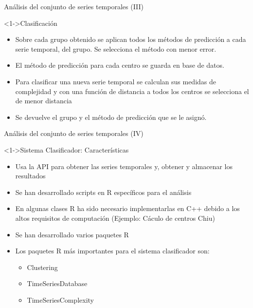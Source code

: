 \begin{tframe}{Análisis del conjunto de series temporales (III)}
	\begin{block}<1->{Clasificación}
		\begin{itemize}
			\item<+-| alert@+> Sobre cada grupo obtenido se aplican todos los métodos de predicción a cada serie temporal, del grupo. Se selecciona el método con menor error.
			\item<+-| alert@+> El método de predicción para cada centro se guarda en base de datos.
			\item<+-| alert@+> Para clasificar una nueva serie temporal se calculan sus medidas de complejidad y con una función de distancia a todos los centros se selecciona el de menor distancia 
			\item<+-| alert@+> Se devuelve el grupo y el método de predicción que se le asignó.
		\end{itemize}
	\end{block}
\end{tframe}

\begin{tframe}{Análisis del conjunto de series temporales (IV)}
\begin{block}<1->{Sistema Clasificador: Características}
	\begin{itemize}
		\item<+-| alert@+> Usa la API para obtener las series temporales y, obtener y almacenar los resultados
		\item<+-| alert@+> Se han desarrollado scripts en R específicos para el análisis
		\item<+-| alert@+> En algunas clases R ha sido necesario implementarlas en C++ debido a los altos requisitos de computación (Ejemplo: Cáculo de centros Chiu)
		\item<+-| alert@+> Se han desarrollado varios paquetes R
		\item<+-| alert@+> Los paquetes R más importantes para el sistema clasificador son:
		\begin{itemize}
			\item<+-| alert@+> Clustering
			\item<+-| alert@+> TimeSeriesDatabase
			\item<+-| alert@+> TimeSeriesComplexity
		\end{itemize}
	\end{itemize}
\end{block}
\end{tframe}


